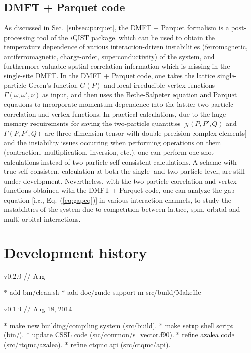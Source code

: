 \subsection{DMFT + Parquet code\label{subsec:parquet code}}
As discussed in Sec.~\ref{subsec:parquet}, the DMFT + Parquet formalism is a post-processing tool of the $i$QIST package, which can be used to obtain the temperature dependence of various interaction-driven instabilities (ferromagnetic, antiferromagnetic, charge-order, superconductivity) of the system, and furthermore valuable spatial correlation information which is missing in the single-site DMFT. In the DMFT + Parquet code, one takes the lattice single-particle Green's function $G(P)$ and local irreducible vertex functions $\Gamma(\omega,\omega',\nu)$ as input, and then uses the Bethe-Salpeter equation and Parquet equations to incorporate momentum-dependence into the lattice two-particle correlation and vertex functions. In practical calculations, due to the huge memory requirements for saving the two-particle quantities [$\chi(P,P',Q)$ and $\Gamma(P,P',Q)$ are three-dimension tensor with double precision complex elements] and the instability issues occurring when performing operations on them (contraction, multiplication, inversion, etc.), one can perform one-shot calculations instead of two-particle self-consistent calculations. A scheme with true self-consistent calculation at both the single- and two-particle level, are still under development. Nevertheless, with the two-particle correlation and vertex functions obtained with the DMFT + Parquet code, one can  analyze the gap equation [i.e., Eq.~(\ref{eq:gapeq})] in various interaction channels, to study the instabilities of the system due to competition between lattice, spin, orbital and multi-orbital interactions.

\section{Development history}

v0.2.0 // Aug
-------------

* add bin/clean.sh
* add doc/guide support in src/build/Makefile


v0.1.9 // Aug 18, 2014
----------------------

* make new building/compiling system (src/build).
* make setup shell script (bin/).
* update CSSL code (src/common/s\_vector.f90).
* refine azalea code (src/ctqmc/azalea).
* refine ctqmc api (src/ctqmc/api).


